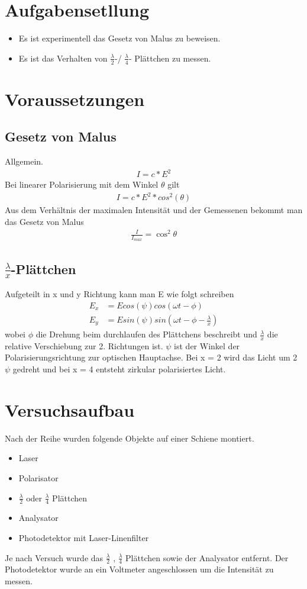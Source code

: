 \documentclass[a4paper]{article}
\begin{document}
\section{Aufgabensetllung}
\begin{itemize}
\item
  Es ist experimentell das Gesetz von Malus zu beweisen.
\item
  Es ist das Verhalten von $\frac{\lambda}{2}$-/ $\frac{\lambda}{4}$- Plättchen zu messen.
\end{itemize}

\section{Voraussetzungen}
\subsection{Gesetz von Malus}
Allgemein.
\begin{align}
  I = c * E^2 
\end{align}
Bei linearer Polarisierung mit dem Winkel $\theta$ gilt
\begin{align}
  I = c * E^2 * cos^2(\theta) 
\end{align}
Aus dem Verhältnis der maximalen Intensität und der Gemessenen bekommt man das Gesetz von Malus
\begin{align}
    \frac{I}{I_{max}}= \cos^2{\theta}
\end{align}
\subsection{$\frac{\lambda}{x}$-Plättchen}
Aufgeteilt in x und y Richtung kann man E wie folgt schreiben
\begin{align}
  E_x &= E cos(\psi) cos(\omega t - \phi)\\
  E_y &= E sin(\psi) sin(\omega t - \phi - \frac{\lambda}{x})
\end{align}
wobei $\phi$ die Drehung beim durchlaufen des Plättchens beschreibt und $\frac{\lambda}{x}$ die relative Verschiebung zur 2. Richtungen ist. $\psi$ ist der Winkel der Polarisierungsrichtung zur optischen Hauptachse.
Bei x = 2 wird das Licht um 2 $\psi$ gedreht und bei x = 4 entsteht zirkular polarisiertes Licht.

\section{Versuchsaufbau}
Nach der Reihe wurden folgende Objekte auf einer Schiene montiert.
\begin{itemize}
\item Laser
\item Polarisator
\item $\frac{\lambda}{2}$ oder $\frac{\lambda}{4}$ Plättchen
\item Analysator
\item Photodetektor mit Laser-Linenfilter
\end{itemize}
Je nach Versuch wurde das $\frac{\lambda}{2}$ , $\frac{\lambda}{4}$ Plättchen sowie der Analysator entfernt.
Der Photodetektor wurde an ein Voltmeter angeschlossen um die Intensität zu messen.
\end{document}
